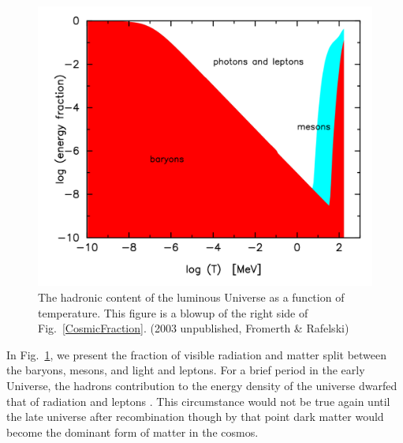 \documentclass[universe,article,submit,moreauthors,pdftex,a4paper]{Definitions/mdpi}
\newcommand*{\rf}[1]{Fig.~{\ref{#1}}}
\begin{document}
\begin{figure}[h]
\centering
\includegraphics[width=\textwidth]{./plots/hadron_content.png}
\caption{The hadronic content of the luminous Universe as a function of temperature. This figure is a blowup of the right side of \rf{CosmicFraction}. (2003 unpublished, Fromerth \& Rafelski) \cite{Rafelski:2019twp}}
\label{hadron_content}
\end{figure}

In \rf{hadron_content}, we present the fraction of visible radiation and matter split between the baryons, mesons, and light and leptons. For a brief period in the early Universe, the hadrons contribution to the energy density of the universe dwarfed that of radiation and leptons \cite{Rafelski:2019twp}. This circumstance would not be true again until the late universe after recombination though by that point dark matter would become the dominant form of matter in the cosmos.
\end{document}
